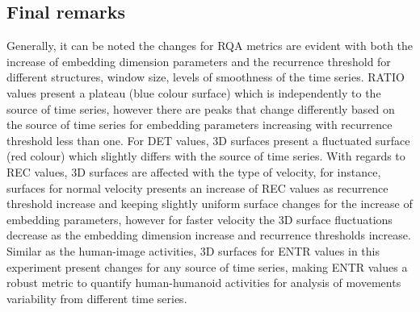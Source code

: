 \newpage
\subsection{Final remarks}
Generally, it can be noted the changes for RQA metrics are evident
with both the increase of embedding dimension parameters and the 
recurrence threshold for different structures, window size, 
levels of smoothness of the time series. 
RATIO values present a plateau (blue colour surface) which is independently 
to the source of time series, however there are peaks that change 
differently based on the source of time series for embedding parameters 
increasing with recurrence threshold less than one.
For DET values, 3D surfaces present a fluctuated surface (red colour)
which slightly differs with the source of time series.
With regards to REC values, 3D surfaces are affected with the type of 
velocity, for instance, surfaces for normal velocity presents 
an increase of REC values as recurrence threshold increase and keeping 
slightly uniform surface changes for the increase of embedding parameters, 
however for faster velocity the 3D surface fluctuations decrease as 
the embedding dimension increase and recurrence thresholds increase.
Similar as the human-image activities, 3D surfaces for ENTR values in 
this experiment present changes for any source of time series,
making ENTR values a robust metric to quantify human-humanoid activities 
for analysis of movements variability from different time series.








